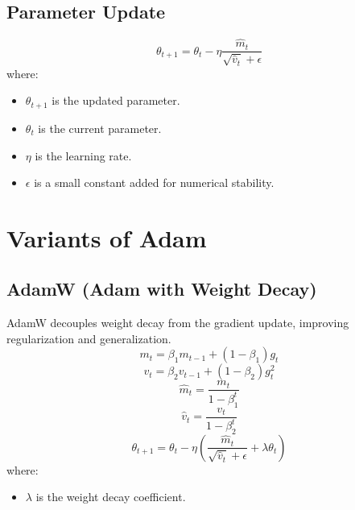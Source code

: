 \documentclass{article}
\begin{document}
\subsection{Parameter Update}
\begin{equation}
\theta_{t+1} = \theta_t - \eta \frac{\hat{m}_t}{\sqrt{\hat{v}_t} + \epsilon}
\end{equation}
where:
\begin{itemize}
    \item $\theta_{t+1}$ is the updated parameter.
    \item $\theta_t$ is the current parameter.
    \item $\eta$ is the learning rate.
    \item $\epsilon$ is a small constant added for numerical stability.
\end{itemize}




\section{Variants of Adam}

\subsection{AdamW (Adam with Weight Decay)}
AdamW decouples weight decay from the gradient update, improving regularization and generalization.
\begin{equation}
m_t = \beta_1 m_{t-1} + (1 - \beta_1) g_t
\end{equation}
\begin{equation}
v_t = \beta_2 v_{t-1} + (1 - \beta_2) g_t^2
\end{equation}
\begin{equation}
\hat{m}_t = \frac{m_t}{1 - \beta_1^t}
\end{equation}
\begin{equation}
\hat{v}_t = \frac{v_t}{1 - \beta_2^t}
\end{equation}
\begin{equation}
\theta_{t+1} = \theta_t - \eta \left( \frac{\hat{m}_t}{\sqrt{\hat{v}_t} + \epsilon} + \lambda \theta_t \right)
\end{equation}
where:
\begin{itemize}
    \item $\lambda$ is the weight decay coefficient.
\end{itemize}
\end{document}
